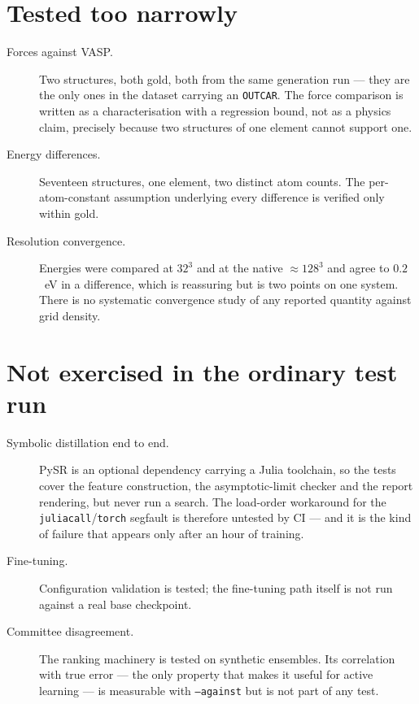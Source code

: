 \documentclass[11pt,a4paper]{report}
\newcommand{\file}[1]{\texttt{#1}}
\newcommand{\opt}[1]{\texttt{#1}}
\begin{document}
\section{Tested too narrowly}

\begin{description}
\item[Forces against VASP.] Two structures, both gold, both from the same
  generation run --- they are the only ones in the dataset carrying an
  \file{OUTCAR}. The force comparison is written as a characterisation with a
  regression bound, not as a physics claim, precisely because two structures of
  one element cannot support one.
\item[Energy differences.] Seventeen structures, one element, two distinct
  atom counts. The per-atom-constant assumption underlying every difference is
  verified only within gold.
\item[Resolution convergence.] Energies were compared at $32^3$ and at the
  native $\approx 128^3$ and agree to $0.2$~eV in a difference, which is
  reassuring but is two points on one system. There is no systematic
  convergence study of any reported quantity against grid density.
\end{description}

\section{Not exercised in the ordinary test run}

\begin{description}
\item[Symbolic distillation end to end.] PySR is an optional dependency
  carrying a Julia toolchain, so the tests cover the feature construction, the
  asymptotic-limit checker and the report rendering, but never run a search.
  The load-order workaround for the \opt{juliacall}/\opt{torch} segfault is
  therefore untested by CI --- and it is the kind of failure that appears only
  after an hour of training.
\item[Fine-tuning.] Configuration validation is tested; the fine-tuning path
  itself is not run against a real base checkpoint.
\item[Committee disagreement.] The ranking machinery is tested on synthetic
  ensembles. Its correlation with true error --- the only property that makes
  it useful for active learning --- is measurable with \opt{--against} but is
  not part of any test.
\end{description}
\end{document}
